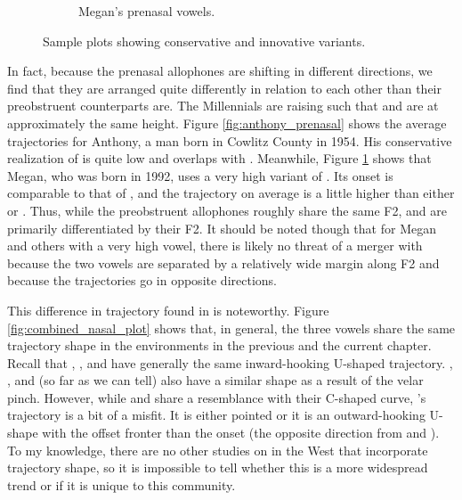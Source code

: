\begin{figure}[tb!]
\begin{subfigure}[t]{2.925in}
        \caption{Megan's prenasal vowels.}
        \label{fig:megan_prenasal}
    \end{subfigure}
    \hspace{\fill}
    \caption{Sample plots showing conservative and innovative \ban variants.}
    \label{fig:anthony_and_megan}
\end{figure}

In fact, because the prenasal allophones are shifting in different directions, we find that they  are arranged quite differently in relation to each other than their preobstruent counterparts are. The Millennials are raising \ban such that \ban and \ben are at approximately the same height. Figure \ref{fig:anthony_prenasal} shows the average trajectories for Anthony, a man born in Cowlitz County in 1954. His conservative realization of \ban is quite low and overlaps with \bat. Meanwhile, Figure \ref{fig:megan_prenasal} shows that Megan, who was born in 1992, uses a very high variant of \ban. Its onset is comparable to that of \face, and the trajectory on average is a little higher than either \bet or \ben. Thus, while the preobstruent allophones roughly share the same F2, \ban and \ben are primarily differentiated by their F2. It should be noted though that for Megan and others with a very high \ban vowel, there is likely no threat of a merger with \ben because the two vowels are separated by a relatively wide margin along F2 and because the trajectories go in opposite directions.

This difference in trajectory found in \ben is noteworthy. Figure \ref{fig:combined_nasal_plot} shows that, in general, the three vowels share the same trajectory shape in the environments in the previous and the current chapter. Recall that \bat, \bet, and \bit have generally the same inward-hooking U-shaped trajectory. \bang, \bing, and (so far as we can tell) \beng also have a similar shape as a result of the velar pinch. However, while \ban and \bin share a resemblance with their C-shaped curve, \ben's trajectory is a bit of a misfit. It is either pointed or it is an outward-hooking U-shape with the offset fronter than the onset (the opposite direction from \ban and \bin). To my knowledge, there are no other studies on \ben in the West that incorporate trajectory shape, so it is impossible to tell whether this is a more widespread trend or if it is unique to this community.

